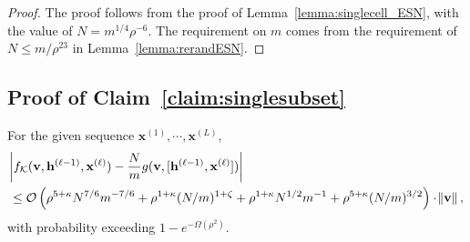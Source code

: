 \begin{proof}
	The proof follows from the proof of Lemma~\ref{lemma:singlecell_ESN}, with the value of $N = m^{1/4} \rho^{-6}$. The requirement on $m$ comes from the requirement of $N \le m/\rho^{23}$ in Lemma~\ref{lemma:rerandESN}.
\end{proof}
\fi




\subsection{Proof of Claim~\ref{claim:singlesubset}}
\begin{claim}\label{claim:singlesubset_proof}
	For the given sequence $\mathbf{x}^{(1)}, \cdots, \mathbf{x}^{(L)}$,
	\begin{align*}
		&\abs{f_{\mathcal{K}}(\mathbf{v}, \mathbf{h}^{(\ell-1)}, \mathbf{x}^{(\ell)}) - \frac{N}{m}g(\mathbf{v}, [\mathbf{h}^{(\ell-1)}, \mathbf{x}^{(\ell)}])} \\&\le  \mathcal{O}\left(\rho^{5 + \kappa} N^{7/6} m^{-7/6} + \rho^{1 + \kappa} (N/m)^{1+\zeta} + \rho^{1+\kappa} N^{1/2} m^{-1}  + \rho^{5 + \kappa} (N/m)^{3/2}\right) \cdot \norm{\mathbf{v}},
	\end{align*}
	with probability exceeding $1 - e^{-\Omega(\rho^2)}$.
\end{claim}

